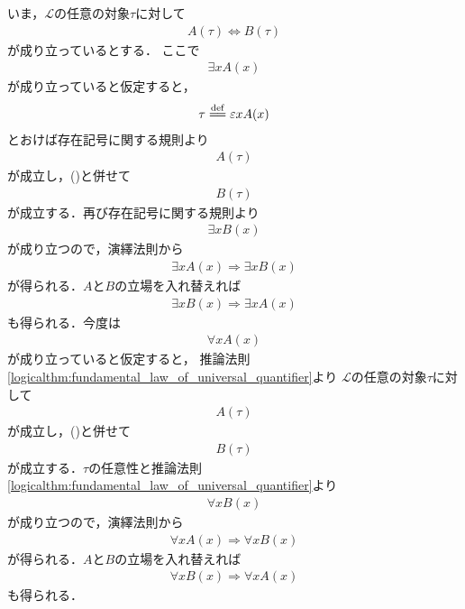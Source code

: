 	\begin{prf}
		いま，$\mathcal{L}$の任意の対象$\tau$に対して
		\begin{align}
			A(\tau) \Longleftrightarrow B(\tau)
			\label{logicalthm:properties_of_quantifiers_1}
		\end{align}
		が成り立っているとする．
		ここで
		\begin{align}
			\exists x A(x)
		\end{align}
		が成り立っていると仮定すると，
		\begin{align}
			\tau \defeq \varepsilon x A(x)
		\end{align}
		とおけば存在記号に関する規則より
		\begin{align}
			A(\tau)
		\end{align}
		が成立し，()と併せて
		\begin{align}
			B(\tau)
		\end{align}
		が成立する．再び存在記号に関する規則より
		\begin{align}
			\exists x B(x)
		\end{align}
		が成り立つので，演繹法則から
		\begin{align}
			\exists x A(x) \Longrightarrow \exists x B(x)
		\end{align}
		が得られる．$A$と$B$の立場を入れ替えれば
		\begin{align}
			\exists x B(x) \Longrightarrow \exists x A(x)
		\end{align}
		も得られる．今度は
		\begin{align}
			\forall x A(x)
		\end{align}
		が成り立っていると仮定すると，
		推論法則\ref{logicalthm:fundamental_law_of_universal_quantifier}より
		$\mathcal{L}$の任意の対象$\tau$に対して
		\begin{align}
			A(\tau)
		\end{align}
		が成立し，()と併せて
		\begin{align}
			B(\tau)
		\end{align}
		が成立する．$\tau$の任意性と推論法則\ref{logicalthm:fundamental_law_of_universal_quantifier}より
		\begin{align}
			\forall x B(x)
		\end{align}
		が成り立つので，演繹法則から
		\begin{align}
			\forall x A(x) \Longrightarrow \forall x B(x)
		\end{align}
		が得られる．$A$と$B$の立場を入れ替えれば
		\begin{align}
			\forall x B(x) \Longrightarrow \forall x A(x)
		\end{align}
		も得られる．
		\QED
	\end{prf}
	
